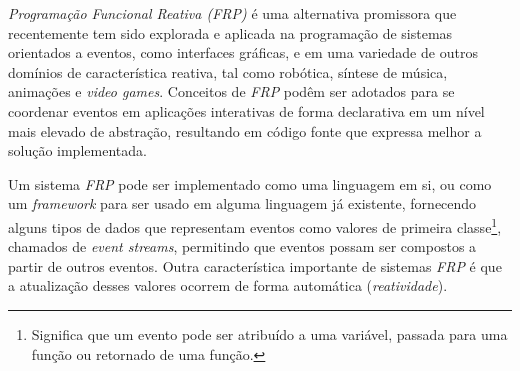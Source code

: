 
%

\emph{Programação Funcional Reativa (FRP)} é uma
alternativa promissora que recentemente tem sido
explorada e aplicada na programação de sistemas
orientados a eventos, como interfaces gráficas,
e em uma variedade de outros domínios
de característica reativa, tal como robótica,
síntese de música, animações e \emph{video games}.
Conceitos de \emph{FRP} podêm ser adotados para
se coordenar eventos em aplicações interativas de forma declarativa
em um nível mais elevado de abstração, resultando em
código fonte que expressa melhor a solução implementada.




Um sistema \emph{FRP} pode ser implementado como uma
linguagem em si, ou como um \emph{framework} para ser
usado em alguma linguagem já existente, fornecendo alguns
tipos de dados que representam eventos como valores de
primeira classe\footnote{
  Significa que um evento pode ser atribuído a uma
  variável, passada para uma função ou retornado de
  uma função.
},
chamados de \emph{event streams}, permitindo que eventos
possam ser compostos a partir de outros eventos.
Outra característica importante de sistemas \emph{FRP}
é que a atualização desses valores ocorrem de forma
automática (\emph{reatividade}).


